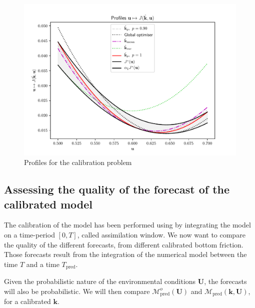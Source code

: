 \documentclass[preprint, 1p]{elsarticle}
\begin{document}
\begin{figure}[!h]
  \centering
  \includegraphics[width=.8\textwidth]{Figures/profile_swe}
  \caption{Profiles for the calibration problem}
\label{fig:profiles_swe}
\end{figure}

\subsection{Assessing the quality of the forecast of the calibrated model}
The calibration of the model has been performed using by integrating the model on a time-period $[0, T]$, called assimilation window. 
We now want to compare the quality of the different forecasts, from different calibrated bottom friction.
Those forecasts result from the integration of the numerical model between the time $T$ and a time $T_{\mathrm{pred}}$.

Given the probabilistic nature of the environmental conditions $\mathbf{U}$, the forecasts will also be probabilistic. We will then compare $\mathcal{M}_{\mathrm{pred}}^o(\mathbf{U})$ and $\mathcal{M}_{\mathrm{pred}}(\mathbf{k},\mathbf{U})$, for a calibrated $\mathbf{k}$.
\end{document}
